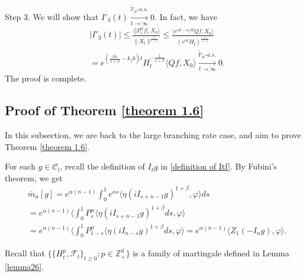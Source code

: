 \documentclass[12pt,a4paper]{amsart}
\theoremstyle{plain}
\theoremstyle{definition}
\numberwithin{equation}{section}
\begin{document}
	Step 3. We will show that $I'_3(t) \xrightarrow[t\to \infty]{\tilde {\mathbb P}_\mu \text{-} a.s.} 0$.
In fact, we have
\begin{equation}\begin{split}
	&|I'_3(t)|
     \leq \frac{\langle |P^\alpha_tf|,X_0\rangle}{\|X_t\|^{\frac{1}{1+\beta}}}
	\leq \frac{\langle e^{\alpha t - \kappa_f b t}Qf,X_0\rangle}{(e^{\alpha t} H_t)^{\frac{1}{1+\beta}}}
	\\& = e^{(\frac{\beta \alpha }{1+\beta} - k_fb)t} H_t^{-\frac{1}{1+\beta}} \langle Qf,X_0\rangle
	\xrightarrow[t\to \infty]{\tilde {\mathbb P}_\mu \text{-} a.s.} 0.
\end{split}\end{equation}
	The proof is complete.
\subsection{Proof of Theorem \ref{theorem 1.6}}\label{large rate again}
In this subsection, we are back to the large branching rate case, and aim to prove Theorem \ref{theorem 1.6}.

For each $g\in \mathcal{C}_l$, recall the definition of $I_tg$ in \eqref{definition of Itf}.
By Fubini's theorem, we get
\begin{align}\label{equ: transform of mn}
    &\bar{m}_n[g]=e^{\alpha(n-1)}\int_0^1 e^{\alpha s}\langle \eta(iI_{s+n-1}g)^{1+\beta}, \varphi\rangle ds\\
    &=e^{\alpha(n-1)}\langle \int_0^1 P_s^{\alpha}\langle \eta(iI_{s+n-1}g)^{1+\beta}ds, \varphi\rangle\\
    &=e^{\alpha(n-1)}\langle \int_0^1 P_{1-s}^{\alpha}\langle \eta(iI_{n-s}g)^{1+\beta}ds, \varphi\rangle=e^{\alpha(n-1)}\langle Z_1(-I_ng), \varphi\rangle.
\end{align}

Recall that $\Big\{\{H^p_t, \mathscr{F}_t\}_{t\geq 0};p\in \mathbb{Z}_+^d\Big\}$ is a family of martingale defined in Lemma \ref{lemma26}.
\end{document}

